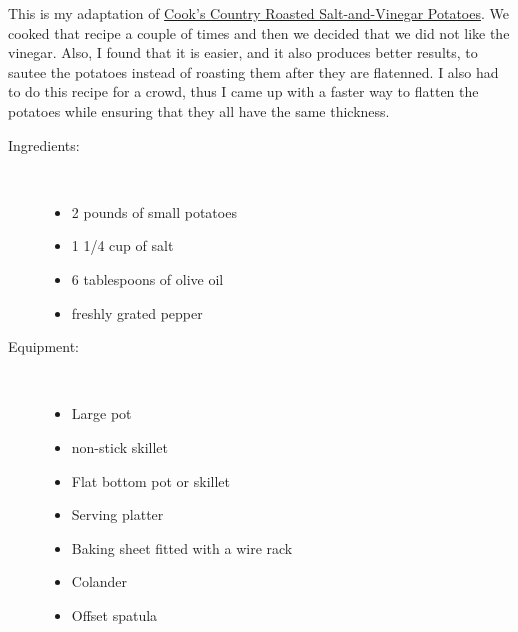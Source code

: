 \documentclass[11pt,letterpaper]{article}
\begin{document}


This is my adaptation of \href{https://www.cookscountry.com/recipes/7126-roasted-salt-and-vinegar-potatoes?extcode=MCSKD10L0&ref=new_search_experience_1}{Cook's Country Roasted Salt-and-Vinegar Potatoes}. We cooked that recipe a couple of times and then we decided that we did not like the vinegar. Also, I found that it is easier, and it also produces better results, to sautee the potatoes instead of roasting them after they are flatenned. I also had to do this recipe for a crowd, thus I came up with a faster way to flatten the potatoes while ensuring that they all have the same thickness.

\begin{description}

\item[Ingredients:]\ \\
	\begin{itemize}
	\item 2 pounds of small potatoes
	\item 1 1/4 cup of salt
	\item 6 tablespoons of olive oil
	\item freshly grated pepper
	\end{itemize}

\item[Equipment:]\ \\
	\begin{itemize}
	\item Large pot
	\item non-stick skillet
	\item Flat bottom pot or skillet
	\item Serving platter
        \item Baking sheet fitted with a wire rack
        \item Colander
        \item Offset spatula
	\end{itemize}


\end{description}
\end{document}
